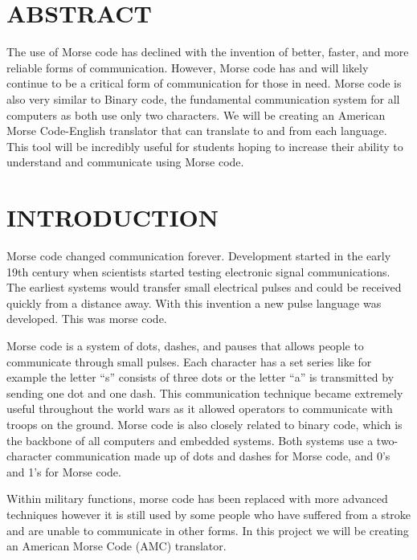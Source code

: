 \documentclass[12pt]{article}
\begin{document}
	\tableofcontents
	\pagebreak
	
	\section{ABSTRACT}
	The use of Morse code has declined with the invention of better, faster, and more reliable forms of communication. However, Morse code has and will likely continue to be a critical form of communication for those in need. Morse code is also very similar to Binary code, the fundamental communication system for all computers as both use only two characters. We will be creating an American Morse Code-English translator that can translate to and from each language. This tool will be incredibly useful for students hoping to increase their ability to understand and communicate using Morse code.
	
	\section{INTRODUCTION}
	Morse code changed communication forever. Development started in the early 19th century when scientists started testing electronic signal communications. The earliest systems would transfer small electrical pulses and could be received quickly from a distance away. With this invention a new pulse language was developed. This was morse code. 
	
	Morse code is a system of dots, dashes, and pauses that allows people to communicate through small pulses. Each character has a set series like for example the letter “s” consists of three dots or the letter “a” is transmitted by sending one dot and one dash. This communication technique became extremely useful throughout the world wars as it allowed operators to communicate with troops on the ground. Morse code is also closely related to binary code, which is the backbone of all computers and embedded systems. Both systems use a two-character communication made up of dots and dashes for Morse code, and 0’s and 1’s for Morse code.
	
	Within military functions, morse code has been replaced with more advanced techniques however it is still used by some people who have suffered from a stroke and are unable to communicate in other forms. In this project we will be creating an American Morse Code (AMC) translator.
	
\end{document}
